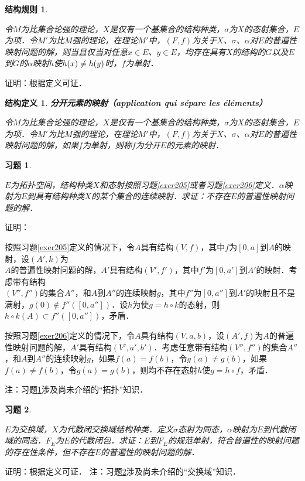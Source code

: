 \documentclass[12pt, a4paper, oneside]{book}
\newtheorem{STdef}{结构定义}
\newtheorem{CST}{结构规则}
\newtheorem{exer}{习题}
\begin{document}
			\begin{CST}\label{CST23}
				\hfill\par
				令$M$为比集合论强的理论，$X$是仅有一个基集合的结构种类，$\sigma$为$X$的态射集合，$E$为项．令$M'$为比$M$强的理论，在理论$M'$中，$(F, f)$为关于$X$、$\sigma$、$\alpha$对$E$的普遍性映射问题的解，则当且仅当对任意$x\in E$、$y\in E$，均存在具有$X$的结构的$G$以及$E$到$G$的$\alpha$映射$h$使$h(x)\\\neq h(y)$时，$f$为单射．
			\end{CST}
			证明：根据定义可证．
						
			\begin{STdef}
				\textbf{分开元素的映射（application qui sépare les éléments）}
				\par
				令$M$为比集合论强的理论，$X$是仅有一个基集合的结构种类，$\sigma$为$X$的态射集合，$E$为项．令$M'$为比$M$强的理论，在理论$M'$中，$(F, f)$为关于$X$、$\sigma$、$\alpha$对$E$的普遍性映射问题的解，如果$f$为单射，则称$f$为分开$E$的元素的映射．
			\end{STdef}

			\begin{exer}\label{exer210}
				\hfill\par
				$E$为拓扑空间，结构种类$X$和态射按照习题\ref{exer205}或者习题\ref{exer206}定义．$\alpha$映射为$E$到具有结构种类$X$的某个集合的连续映射．求证：不存在$E$的普遍性映射问题的解．
			\end{exer}
			证明：
			\par
			按照习题\ref{exer205}定义的情况下，令$A$具有结构$(V, f)$，其中$f$为$[0, a]$到$A$的映射，设$(A', k)$为\\$A$的普遍性映射问题的解，$A'$具有结构$(V', f')$，其中$f'$为$[0, a']$到$A'$的映射．考虑带有结构\\$(V'', f'')$的集合$A''$，和$A$到$A''$的连续映射$g$，其中$f''$为$[0, a'']$到$A'$的映射且不是满射，$g(0)\notin f''([0, a''])$．设$h$为使$g=h\circ k$的态射，则$h\circ k(A)\subset f''([0, a''])$，矛盾．
			\par
			按照习题\ref{exer206}定义的情况下，令$A$具有结构$(V, a, b)$，设$(A', f)$为$A$的普遍性映射问题的解，$A'$具有结构$(V', a', b')$．考虑任意带有结构$(V'', f'')$的集合$A''$，和$A$到$A''$的连续映射$g$，如果$f(a)=f(b)$，令$g(a)\neq g(b)$，如果$f(a)\neq f(b)$，令$g(a)=g(b)$，则均不存在态射$h$使$g=h\circ f$，矛盾．
			\par
			注：习题\ref{exer210}涉及尚未介绍的“拓扑”知识．
			
			\begin{exer}\label{exer211}
				\hfill\par
				$E$为交换域，$X$为代数闭交换域结构种类．定义$\sigma$态射为同态，$\alpha$映射为$E$到代数闭域的同态．$F_E$为$E$的代数闭包．求证：$E$到$F_E$的规范单射，符合普遍性的映射问题的存在性条件，但不存在$E$的普遍性的映射问题的解．
			\end{exer}
			证明：根据定义可证．
			注：习题\ref{exer211}涉及尚未介绍的“交换域”知识．
			
\end{document}
